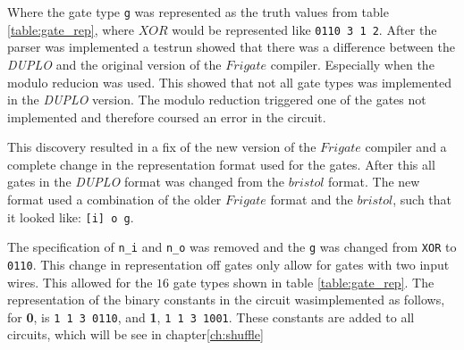 \documentclass[twoside,11pt,openright]{report}
\newcommand{\DUPLO}{\textit{DUPLO} }
\begin{document}
Where the gate type \verb|g| was represented as the truth values from table \ref{table:gate_rep}, where $XOR$ would be represented like \verb|0110 3 1 2|. After the parser was implemented a testrun showed that there was a difference between the \DUPLO and the original version of the $Frigate$ compiler. Especially when the modulo reducion was used. This showed that not all gate types was implemented in the \DUPLO version. The modulo reduction triggered one of the gates not implemented and therefore coursed an error in the circuit.

\bigskip

\begin{table}[t]
\centering
{}
\caption{A table of the 16 different gate types, that can be used in a circuit of the type used in \DUPLO}
\label{table:gate_rep}
\end{table}


This discovery resulted in a fix of the new version of the $Frigate$ compiler and a complete change in the representation format used for the gates. After this all gates in the \DUPLO format was changed from the $bristol$ format. The new format used a combination of the older $Frigate$ format and the $bristol$, such that it looked like: \verb|[i] o g|.

The specification of \verb|n_i| and \verb|n_o| was removed and the \verb|g| was changed from \verb|XOR| to \verb|0110|. This change in representation off gates only allow for gates with two input wires. This allowed for the $16$ gate types shown in table \ref{table:gate_rep}. The representation of the binary constants in the circuit wasimplemented as follows, for \textbf{0}, is \verb|1 1 3 0110|, and \textbf{1}, \verb|1 1 3 1001|. These constants are added to all circuits, which will be see in chapter\ref{ch:shuffle}
\end{document}
